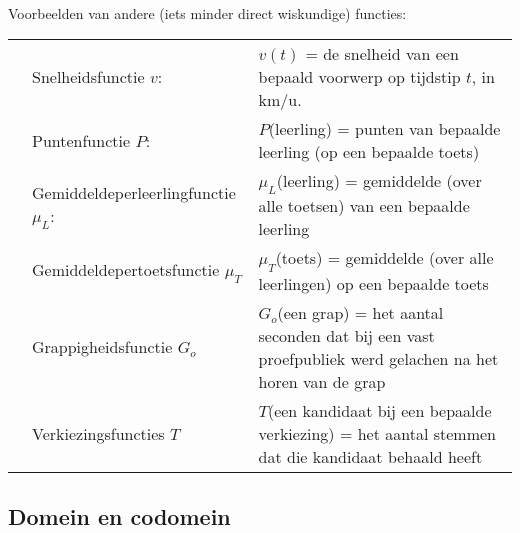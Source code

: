 \documentclass{ximera}
\begin{document}
\\

Voorbeelden van andere (iets minder direct wiskundige) functies:
\\
\begin{tabular}{l l p{10cm}}
    & Snelheidsfunctie $v$:     & $v(t)$ = de snelheid van een bepaald voorwerp op tijdstip $t$, in km/u.  \\	
    & Puntenfunctie $P$:        & $P$(leerling) = punten van bepaalde leerling (op een bepaalde toets)  \\
    & Gemiddeldeperleerlingfunctie $\mu_L$: & $\mu_L$(leerling) = gemiddelde (over alle toetsen) van een bepaalde leerling  \\
    & Gemiddeldepertoetsfunctie $\mu_T$ & $\mu_T$(toets) = gemiddelde (over alle leerlingen) op een bepaalde toets \\
    & Grappigheidsfunctie $G_o$  & $G_o$(een grap) = het aantal seconden dat bij een vast proefpubliek  werd gelachen na het horen van de grap \\
    & Verkiezingsfuncties $T$   & $T$(een kandidaat bij een bepaalde verkiezing) =  het aantal stemmen dat die kandidaat behaald heeft \\
\end{tabular}


\subsection{Domein en codomein}
\end{document}
